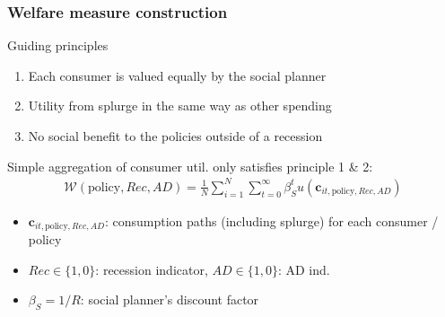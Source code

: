 \documentclass[pdflatex,aspectratio=169]{beamer}
\begin{document}
\begin{frame}
	\frametitle{Welfare measure construction}
	
	Guiding principles
	
	\begin{enumerate}
		\item Each consumer is valued equally by the social planner 
		\item Utility from splurge in the same way as other spending
		\item No social benefit to the policies outside of a recession
	\end{enumerate} 
	
	\vspace{0.6cm}
	\pause
	
	Simple aggregation of consumer util. only satisfies principle 1 \& 2:
	\begin{align*}
		\mathcal{W}(\text{policy},Rec,AD) =\frac{1}{N}\sum_{i=1}^{N} \sum_{t=0}^{\infty} \beta_S^t u(\mathbf{c}_{it,\text{policy},Rec,AD}) 
	\end{align*}
	
	\begin{itemize}[<+->]
		\item $\mathbf{c}_{it,\text{policy},Rec,AD}$: consumption paths (including splurge) for each consumer / policy
		\item $Rec\in\{1,0\}$: recession indicator, $AD\in\{1,0\}$: AD ind.
		\item $\beta_S = 1/R$: social planner's discount factor 
	\end{itemize}	
	
\end{frame}
\end{document}

